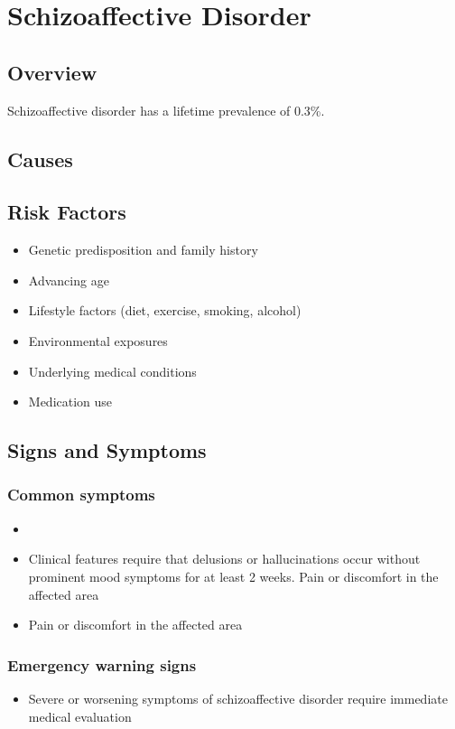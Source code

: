 \chapter{Schizoaffective Disorder}
\label{sec:Schizoaffective Disorder}

\section{Overview}
Schizoaffective disorder has a lifetime prevalence of 0.3\%.
\section{Causes}
\section{Risk Factors}

\begin{itemize}[noitemsep]
  \item Genetic predisposition and family history
  \item Advancing age
  \item Lifestyle factors (diet, exercise, smoking, alcohol)
  \item Environmental exposures
  \item Underlying medical conditions
  \item Medication use
\end{itemize}
\section{Signs and Symptoms}

\subsection{Common symptoms}
\begin{itemize}[noitemsep]
  \item \item Clinical features require that delusions or hallucinations occur without prominent mood symptoms for at least 2 weeks. Pain or discomfort in the affected area    \item Pain or discomfort in the affected area
  \end{itemize}

\subsection{Emergency warning signs}
\begin{itemize}[noitemsep]
  \item Severe or worsening symptoms of schizoaffective disorder require immediate medical evaluation
\end{itemize}
